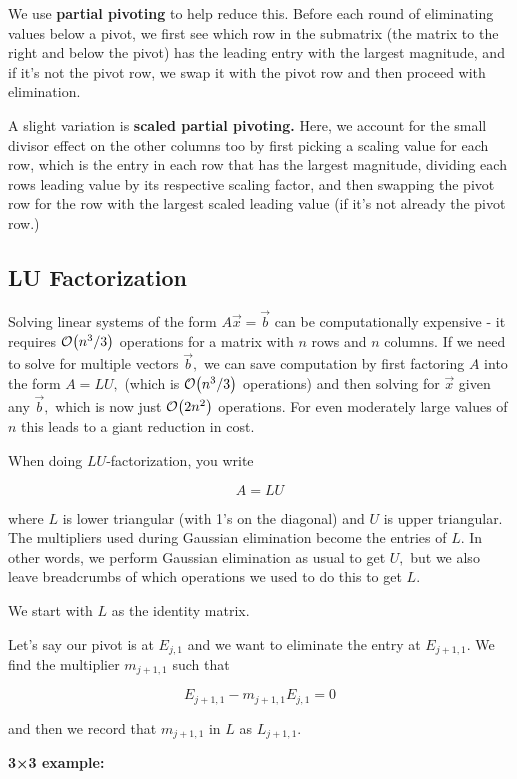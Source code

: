 \documentclass{article}
\begin{document}
We use \textbf{partial pivoting} to help reduce this. Before each round of eliminating values below a pivot, we first see which row in the submatrix (the matrix to the right and below the pivot) has the leading entry with the largest magnitude, and if it's not the pivot row, we swap it with the pivot row and then proceed with elimination.

A slight variation is \textbf{scaled partial pivoting.} Here, we account for the small divisor effect on the other columns too by first picking a scaling value for each row, which is the entry in each row that has the largest magnitude, dividing each rows leading value by its respective scaling factor, and then swapping the pivot row for the row with the largest scaled leading value (if it's not already the pivot row.)

\subsection{LU Factorization}

Solving linear systems of the form $A \vec{x} = \vec{b}$ can be computationally expensive - it requires $\mathcal{O}\!\left(n^3/3\right)$ operations for a matrix with $n$ rows and $n$ columns. If we need to solve for multiple vectors $\vec{b},$ we can save computation by first factoring $A$ into the form $A = LU,$ (which is $\mathcal{O}\!\left(n^3/3\right)$ operations) and then solving for $\vec{x}$ given any $\vec{b},$ which is now just $\mathcal{O}\!\left(2n^2\right)$ operations. For even moderately large values of $n$ this leads to a giant reduction in cost.

When doing $LU$‑factorization, you write

\[ A = LU \]

where $L$ is lower triangular (with 1’s on the diagonal) and $U$ is upper triangular. The multipliers used during Gaussian elimination become the entries of $L$. In other words, we perform Gaussian elimination as usual to get $U,$ but we also leave breadcrumbs of which operations we used to do this to get $L.$

We start with $L$ as the identity matrix.

Let's say our pivot is at $E_{j,1}$ and we want to eliminate the entry at $E_{j+1, 1}.$ We find the multiplier $m_{j+1, 1}$ such that

\[ E_{j+1, 1} - m_{j+1, 1} E_{j, 1} = 0 \]

and then we record that $m_{j+1,1}$ in $L$ as $L_{j+1, 1}.$

\textbf{3×3 example:}
\end{document}
